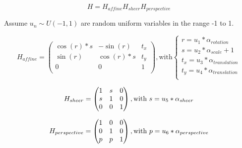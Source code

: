 \[
H = H_{affine} H_{sheer} H_{perspective}
\]

Assume $u_n \sim U(-1,1)$ are random uniform variables in the range -1 to 1.

\[
H_{affine} = 
\begin{pmatrix}
\cos(r)*s & -\sin(r) & t_x \\
\sin(r)& \cos(r)*s & t_y \\
0 & 0 & 1 \\
\end{pmatrix}
, \text{with}
\begin{cases}
r=u_1*\alpha_{rotation} \\
s=u_2*\alpha_{scale}+1 \\
t_x=u_3*\alpha_{translation} \\
t_y=u_4*\alpha_{translation} \\
\end{cases}
\]

\[
H_{sheer} = 
\begin{pmatrix}
1 & s & 0 \\
s & 1 & 0 \\
0 & 0 & 1 \\
\end{pmatrix}
, \text{with}
\ s=u_5*\alpha_{sheer} \\
\]

\[
H_{perspective} = 
\begin{pmatrix}
1 & 0 & 0 \\
0 & 1 & 0 \\
p & p & 1 \\
\end{pmatrix}
, \text{with}
\ p=u_6*\alpha_{perspective} \\
\]
